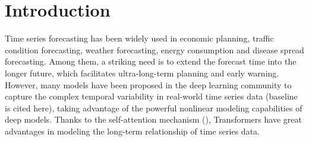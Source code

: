\section{Introduction}
\label{sec:intro}




Time series forecasting has been widely used in economic planning, traffic condition forecasting, weather forecasting, energy consumption and disease spread forecasting. Among them, a striking need is to extend the forecast time into the longer future, which facilitates ultra-long-term planning and early warning.
However, many models have been proposed in the deep learning community to capture the complex temporal variability in real-world time series data (baseline is cited here), taking advantage of the powerful nonlinear modeling capabilities of deep models. Thanks to the self-attention mechanism (), Transformers have great advantages in modeling the long-term relationship of time series data.

